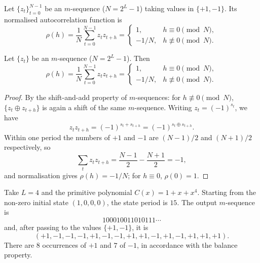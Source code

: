 \begin{definition}\label{def:m_sequence_autocorrelation}
Let \(\{z_t\}_{t=0}^{N-1}\) be an \(m\)-sequence (\(N=2^L-1\)) taking values in \(\{+1,-1\}\). Its normalised autocorrelation function is
\[
\rho(h)=\frac1N\sum_{t=0}^{N-1}z_t z_{t+h}=
\begin{cases}
1,&h\equiv0\pmod N,\\
-1/N,&h\not\equiv0\pmod N.
\end{cases}
\]
\end{definition}

\begin{lemma}\label{ch16_mseq_autocorrelation}
Let \(\{z_t\}\) be an \(m\)-sequence (\(N=2^L-1\)). Then
\[
\rho(h)=\frac1N\sum_{t=0}^{N-1}z_t z_{t+h}=
\begin{cases}
1,&h\equiv0\pmod N,\\
-1/N,&h\not\equiv0\pmod N.
\end{cases}
\]
\end{lemma}

\begin{proof}
By the shift-and-add property of \(m\)-sequences: for \(h\not\equiv0\pmod N\), \(\{z_t\oplus z_{t+h}\}\) is again a shift of the same \(m\)-sequence. Writing \(z_t=(-1)^{s_t}\), we have
\[
z_t z_{t+h}=(-1)^{s_t+s_{t+h}}=(-1)^{s_t\oplus s_{t+h}}.
\]
Within one period the numbers of \(+1\) and \(-1\) are \((N-1)/2\) and \((N+1)/2\) respectively, so
\[
\sum_t z_t z_{t+h}=\frac{N-1}{2}-\frac{N+1}{2}=-1,
\]
and normalisation gives \(\rho(h)=-1/N\); for \(h\equiv0\), \(\rho(0)=1\).
\end{proof}

\begin{example}[Concrete computation of an \(m\)-sequence with \(L=4\)]\label{ex:mseq_L4}
Take \(L=4\) and the primitive polynomial \(C(x)=1+x+x^4\). Starting from the non-zero initial state \((1,0,0,0)\), the state period is \(15\). The output \(m\)-sequence is
\[
100010011010111\cdots
\]
and, after passing to the values \(\{+1,-1\}\), it is
\[
(+1,-1,-1,-1,+1,-1,-1,+1,+1,-1,+1,-1,+1,+1,+1).
\]
There are \(8\) occurrences of \(+1\) and \(7\) of \(-1\), in accordance with the balance property.
\end{example}

